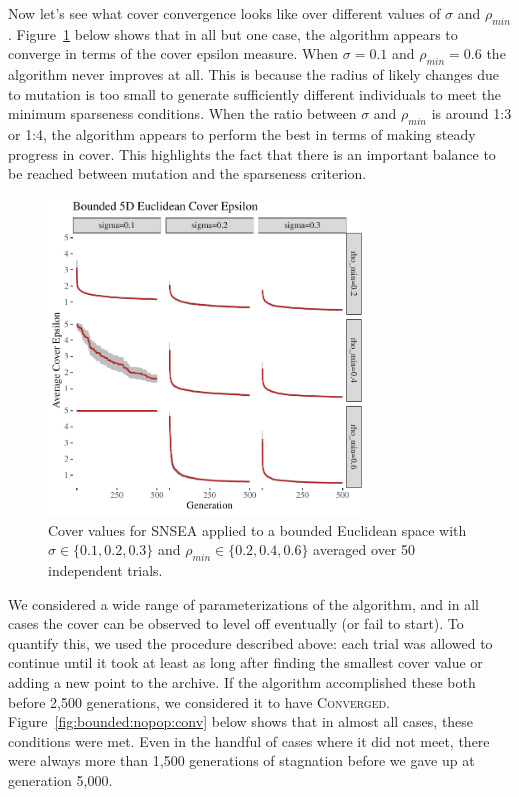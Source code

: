 \documentclass[twoside]{article}
\begin{document}
Now let's see what cover convergence looks like over different values of $\sigma$ and $\rho_{min}$.  Figure~\ref{fig:bounded:nopop:sm} below shows that in all but one case, the algorithm appears to converge in terms of the cover epsilon measure.  When $\sigma=0.1$ and $\rho_{min} = 0.6$ the algorithm never improves at all.  This is because the radius of likely changes due to mutation is too small to generate sufficiently different individuals to meet the minimum sparseness conditions.  When the ratio between $\sigma$ and $\rho_{min}$ is around 1:3 or 1:4, the algorithm appears to perform the best in terms of making steady progress in cover.  This highlights the fact that there is an important balance to be reached between mutation and the sparseness criterion.
%
\begin{figure}[t]
  \center\includegraphics[width=0.75\textwidth]{Figures/bounded-500sm-NOPOP.pdf}
  \caption{\label{fig:bounded:nopop:sm} Cover values for SNSEA applied to a bounded Euclidean space with $\sigma\in\{0.1,  0.2, 0.3\}$ and $\rho_{min} \in \{0.2, 0.4, 0.6\}$ averaged over 50 independent trials.}
\end{figure}
%
We considered a wide range of parameterizations of the algorithm, and in all cases the cover can be observed to level off eventually (or fail to start).  To quantify this, we used the procedure described above:  each trial was allowed to continue until it took at least as long after finding the smallest cover value or adding a new point to the archive.  If the algorithm accomplished these both before 2,500 generations, we considered it to have \textsc{Converged}.  Figure~\ref{fig:bounded:nopop:conv} below shows that in almost all cases, these conditions were met.  Even in the handful of cases where it did not meet, there were always more than 1,500 generations of stagnation before we gave up at generation 5,000.  
\end{document}
